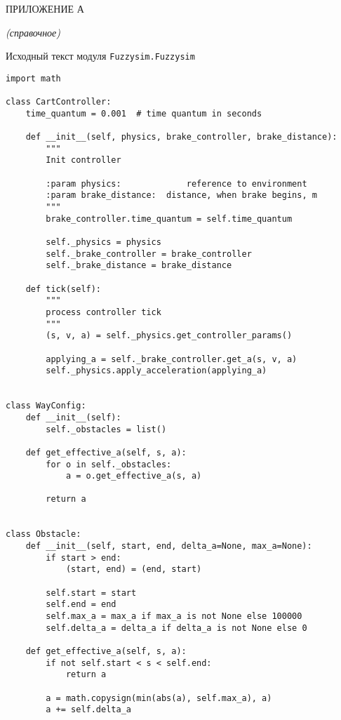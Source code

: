 \lstset{style=pythoninlinestyle}


 \begin{center}
	ПРИЛОЖЕНИЕ А
	
	\textit{(справочное)}
\end{center}


\begin{center}
	Исходный текст модуля \lstinline!Fuzzysim.Fuzzysim!
\end{center}



\begin{lstlisting}[style=pythonstyle,caption={ }, label=lst:func:1]
import math

class CartController:
	time_quantum = 0.001  # time quantum in seconds

	def __init__(self, physics, brake_controller, brake_distance):
		"""
		Init controller

		:param physics:				reference to environment
		:param brake_distance: 	distance, when brake begins, m
		"""
		brake_controller.time_quantum = self.time_quantum

		self._physics = physics
		self._brake_controller = brake_controller
		self._brake_distance = brake_distance

	def tick(self):
		"""
		process controller tick
		"""
		(s, v, a) = self._physics.get_controller_params()

		applying_a = self._brake_controller.get_a(s, v, a)
		self._physics.apply_acceleration(applying_a)


class WayConfig:
	def __init__(self):
		self._obstacles = list()

	def get_effective_a(self, s, a):
		for o in self._obstacles:
			a = o.get_effective_a(s, a)

		return a


class Obstacle:
	def __init__(self, start, end, delta_a=None, max_a=None):
		if start > end:
			(start, end) = (end, start)

		self.start = start
		self.end = end
		self.max_a = max_a if max_a is not None else 100000
		self.delta_a = delta_a if delta_a is not None else 0

	def get_effective_a(self, s, a):
		if not self.start < s < self.end:
			return a

		a = math.copysign(min(abs(a), self.max_a), a)
		a += self.delta_a


\end{lstlisting}
